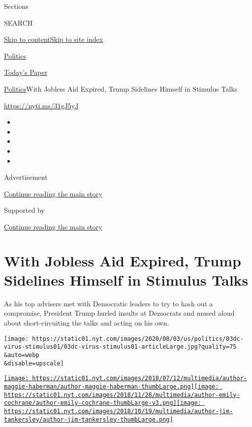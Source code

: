 Sections

SEARCH

\protect\hyperlink{site-content}{Skip to
content}\protect\hyperlink{site-index}{Skip to site index}

\href{https://www.nytimes.com/section/politics}{Politics}

\href{https://myaccount.nytimes.com/auth/login?response_type=cookie\&client_id=vi}{}

\href{https://www.nytimes.com/section/todayspaper}{Today's Paper}

\href{/section/politics}{Politics}\textbar{}With Jobless Aid Expired,
Trump Sidelines Himself in Stimulus Talks

\url{https://nyti.ms/31gJ5yJ}

\begin{itemize}
\item
\item
\item
\item
\item
\end{itemize}

Advertisement

\protect\hyperlink{after-top}{Continue reading the main story}

Supported by

\protect\hyperlink{after-sponsor}{Continue reading the main story}

\hypertarget{with-jobless-aid-expired-trump-sidelines-himself-in-stimulus-talks}{%
\section{With Jobless Aid Expired, Trump Sidelines Himself in Stimulus
Talks}\label{with-jobless-aid-expired-trump-sidelines-himself-in-stimulus-talks}}

As his top advisers met with Democratic leaders to try to hash out a
compromise, President Trump hurled insults at Democrats and mused aloud
about short-circuiting the talks and acting on his own.

\texttt{[image: https://static01.nyt.com/images/2020/08/03/us/politics/03dc-virus-stimulus01/03dc-virus-stimulus01-articleLarge.jpg?quality=75\\\&auto=webp\\\&disable=upscale]}

\href{https://www.nytimes.com/by/maggie-haberman}{\texttt{[image: https://static01.nyt.com/images/2018/07/12/multimedia/author-maggie-haberman/author-maggie-haberman-thumbLarge.png]}}\href{https://www.nytimes.com/by/emily-cochrane}{\texttt{[image: https://static01.nyt.com/images/2018/11/28/multimedia/author-emily-cochrane/author-emily-cochrane-thumbLarge-v3.png]}}\href{https://www.nytimes.com/by/jim-tankersley}{\texttt{[image: https://static01.nyt.com/images/2018/10/19/multimedia/author-jim-tankersley/author-jim-tankersley-thumbLarge.png]}}

